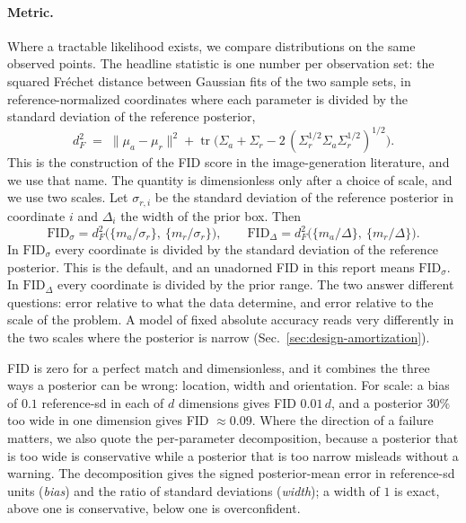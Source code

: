 \documentclass[10pt]{article}
\newcommand{\FIDsd}{\mathrm{FID}_{\sigma}}
\newcommand{\FIDpr}{\mathrm{FID}_{\Delta}}
\begin{document}
\paragraph{Metric.} Where a tractable likelihood exists, we compare distributions on the same observed
points. The headline statistic is one number per observation set: the squared Fr\'echet distance
between Gaussian fits of the two sample sets, in reference-normalized coordinates where each parameter
is divided by the standard deviation of the reference posterior,
\begin{equation}
  d_F^2 \;=\; \lVert \mu_a - \mu_r \rVert^2
  + \operatorname{tr}\!\bigl(\Sigma_a + \Sigma_r
  - 2\,(\Sigma_r^{1/2} \Sigma_a \Sigma_r^{1/2})^{1/2}\bigr).
  \label{eq:fid}
\end{equation}
This is the construction of the FID score in the image-generation literature, and we use that name.
The quantity is dimensionless only after a choice of scale, and we use two scales. Let $\sigma_{r,i}$
be the standard deviation of the reference posterior in coordinate $i$ and $\Delta_i$ the width of the
prior box. Then
\begin{equation}
  \FIDsd = d_F^2\bigl(\{m_a/\sigma_r\},\ \{m_r/\sigma_r\}\bigr), \qquad
  \FIDpr = d_F^2\bigl(\{m_a/\Delta\},\ \{m_r/\Delta\}\bigr).
  \label{eq:fidnorm}
\end{equation}
In $\FIDsd$ every coordinate is divided by the standard deviation of the reference posterior. This is
the default, and an unadorned FID in this report means $\FIDsd$. In $\FIDpr$ every coordinate is
divided by the prior range. The two answer different questions: error relative to what the data
determine, and error relative to the scale of the problem. A model of fixed absolute accuracy reads
very differently in the two scales where the posterior is narrow (Sec.~\ref{sec:design-amortization}).

FID is zero for a perfect match and dimensionless, and it combines the three ways a posterior can be
wrong: location, width and orientation. For scale: a bias of $0.1$ reference-sd in each of $d$
dimensions gives FID $0.01\,d$, and a posterior $30\%$ too wide in one dimension gives FID
$\approx 0.09$. Where the direction of a failure matters, we also quote the per-parameter
decomposition, because a posterior that is too wide is conservative while a posterior that is too
narrow misleads without a warning. The decomposition gives the signed posterior-mean error in
reference-sd units (\emph{bias}) and the ratio of standard deviations (\emph{width}); a width of $1$
is exact, above one is conservative, below one is overconfident.
\end{document}
